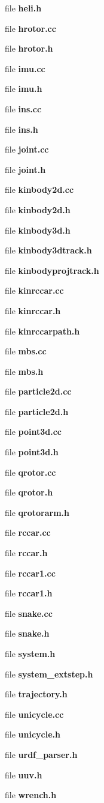 \begin{DoxyCompactItemize}
file {\bf heli.\-h}
\item 
file {\bf hrotor.\-cc}
\item 
file {\bf hrotor.\-h}
\item 
file {\bf imu.\-cc}
\item 
file {\bf imu.\-h}
\item 
file {\bf ins.\-cc}
\item 
file {\bf ins.\-h}
\item 
file {\bf joint.\-cc}
\item 
file {\bf joint.\-h}
\item 
file {\bf kinbody2d.\-cc}
\item 
file {\bf kinbody2d.\-h}
\item 
file {\bf kinbody3d.\-h}
\item 
file {\bf kinbody3dtrack.\-h}
\item 
file {\bf kinbodyprojtrack.\-h}
\item 
file {\bf kinrccar.\-cc}
\item 
file {\bf kinrccar.\-h}
\item 
file {\bf kinrccarpath.\-h}
\item 
file {\bf mbs.\-cc}
\item 
file {\bf mbs.\-h}
\item 
file {\bf particle2d.\-cc}
\item 
file {\bf particle2d.\-h}
\item 
file {\bf point3d.\-cc}
\item 
file {\bf point3d.\-h}
\item 
file {\bf qrotor.\-cc}
\item 
file {\bf qrotor.\-h}
\item 
file {\bf qrotorarm.\-h}
\item 
file {\bf rccar.\-cc}
\item 
file {\bf rccar.\-h}
\item 
file {\bf rccar1.\-cc}
\item 
file {\bf rccar1.\-h}
\item 
file {\bf snake.\-cc}
\item 
file {\bf snake.\-h}
\item 
file {\bf system.\-h}
\item 
file {\bf system\-\_\-extstep.\-h}
\item 
file {\bf trajectory.\-h}
\item 
file {\bf unicycle.\-cc}
\item 
file {\bf unicycle.\-h}
\item 
file {\bf urdf\-\_\-parser.\-h}
\item 
file {\bf uuv.\-h}
\item 
file {\bf wrench.\-h}
\end{DoxyCompactItemize}
